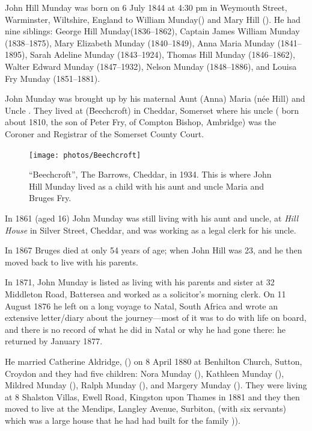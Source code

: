 
John Hill Munday was born on 6 July 1844 at 4:30 pm\cite{GeorgeHillMundayNotes} in Weymouth Street, Warminster, Wiltshire, England\cite{JHMtree, Census1861, JMHbirth} to William Munday() and Mary Hill (). He had nine siblings: George Hill Munday(1836--1862), Captain James William Munday (1838--1875), Mary Elizabeth Munday (1840--1849), Anna Maria Munday (1841--1895), Sarah Adeline Munday (1843--1924), Thomas Hill Munday (1846--1862), Walter Edward Munday (1847--1932), Nelson Munday (1848--1886), and Louisa Fry Munday (1851--1881).

John Munday was brought up by his maternal Aunt (Anna) Maria (n\'{e}e Hill) and Uncle . They lived at  (\f{Beechcroft}) in Cheddar, Somerset where his uncle ( born about 1810, the son of Peter Fry, of Compton Bishop, Ambridge) was the Coroner and Registrar of the Somerset County Court.

\begin{figure}
	\centering
	\texttt{[image: photos/Beechcroft]}
	\caption{``Beechcroft'', The Barrows, Cheddar, in 1934. This is where John Hill Munday lived as a child with his aunt and uncle Maria and Bruges Fry.\cite{BeechcroftPostcard}}
	\label{Beechcroft}
\end{figure}


In 1861 (aged 16) John Munday was still living with his aunt and uncle, at \emph{Hill House} in Silver Street, Cheddar,\cite{Census1861} 
and was working as a legal clerk for his uncle.\cite{Census1861}

In 1867 Bruges died at only 54 years of age;\cite{BrugesDeath} when John Hill was 23, and he then moved back to live with his parents.

In 1871, John Munday is listed as living with his parents and sister at 32 Middleton Road, Battersea and worked as a solicitor's morning clerk.\cite{JohnHillMunday1871} On 11 August 1876 he left on a long voyage to Natal, South Africa and wrote an extensive letter/diary about the journey---most of it was to do with life on board, and there is no record of what he did in Natal or why he had gone there: he returned by January 1877.

He married Catherine Aldridge, () on 8 April 1880 at Benhilton Church, Sutton, Croydon\cite{JHM-CA-marriage-announcement, JHMtree} and they had five children: Nora Munday (), Kathleen Munday (), Mildred Munday (), Ralph Munday (), and Margery Munday ().  They were living at 8 Shalston Villas, Ewell Road, Kingston upon Thames in 1881\cite{JohnHillMunday1881} and they then moved to live at the Mendips, Langley Avenue, Surbiton, (with six servants)  which was  a large house that he had had  built for the family )\cite{JohnHillMunday 1891}).

